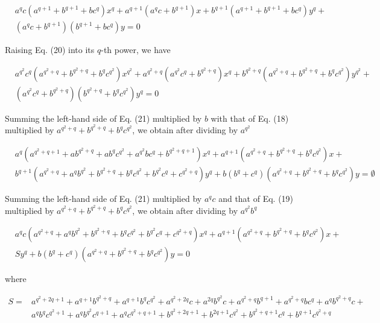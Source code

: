 \documentclass[10pt]{article}
\begin{document}
\begin{align*}
& a^{q} c\left(a^{q+1}+b^{q+1}+b c^{q}\right) x^{q}+a^{q+1}\left(a^{q} c+b^{q+1}\right) x+b^{q+1}\left(a^{q+1}+b^{q+1}+b c^{q}\right) y^{q}+ \\
& \left(a^{q} c+b^{q+1}\right)\left(b^{q+1}+b c^{q}\right) y=0 \tag{20}
\end{align*}


Raising Eq. (20) into its $q$-th power, we have


\begin{align*}
& a^{q^{2}} c^{q}\left(a^{q^{2}+q}+b^{q^{2}+q}+b^{q} c^{q^{2}}\right) x^{q^{2}}+a^{q^{2}+q}\left(a^{q^{2}} c^{q}+b^{q^{2}+q}\right) x^{q}+b^{q^{2}+q}\left(a^{q^{2}+q}+b^{q^{2}+q}+b^{q} c^{q^{2}}\right) y^{q^{2}}+ \\
& \left(a^{q^{2}} c^{q}+b^{q^{2}+q}\right)\left(b^{q^{2}+q}+b^{q} c^{q^{2}}\right) y^{q}=0 \tag{21}
\end{align*}


Summing the left-hand side of Eq. (21) multiplied by $b$ with that of Eq. (18) multiplied by $a^{q^{2}+q}+b^{q^{2}+q}+ b^{q} c^{q^{2}}$, we obtain after dividing by $a^{q^{2}}$


\begin{align*}
& a^{q}\left(a^{q^{2}+q+1}+a b^{q^{2}+q}+a b^{q} c^{q^{2}}+a^{q^{2}} b c^{q}+b^{q^{2}+q+1}\right) x^{q}+a^{q+1}\left(a^{q^{2}+q}+b^{q^{2}+q}+b^{q} c^{q^{2}}\right) x+ \\
& b^{q+1}\left(a^{q^{2}+q}+a^{q} b^{q^{2}}+b^{q^{2}+q}+b^{q} c^{q^{2}}+b^{q^{2}} c^{q}+c^{q^{2}+q}\right) y^{q}+b\left(b^{q}+c^{q}\right)\left(a^{q^{2}+q}+b^{q^{2}+q}+b^{q} c^{q^{2}}\right) y=\emptyset \tag{Q22}
\end{align*}


Summing the left-hand side of Eq. (21) multiplied by $a^{q} c$ and that of Eq. (19) multiplied by $a^{q^{2}+q}+b^{q^{2}+q}+ b^{q} c^{q^{2}}$, we obtain after dividing by $a^{q^{2}} b^{q}$


\begin{align*}
& a^{q} c\left(a^{q^{2}+q}+a^{q} b^{q^{2}}+b^{q^{2}+q}+b^{q} c^{q^{2}}+b^{q^{2}} c^{q}+c^{q^{2}+q}\right) x^{q}+a^{q+1}\left(a^{q^{2}+q}+b^{q^{2}+q}+b^{q} c^{q^{2}}\right) x+ \\
& S y^{q}+b\left(b^{q}+c^{q}\right)\left(a^{q^{2}+q}+b^{q^{2}+q}+b^{q} c^{q^{2}}\right) y=0 \tag{23}
\end{align*}


where

$$
\begin{aligned}
S= & a^{q^{2}+2 q+1}+a^{q+1} b^{q^{2}+q}+a^{q+1} b^{q} c^{q^{2}}+a^{q^{2}+2 q} c+a^{2 q} b^{q^{2}} c+a^{q^{2}+q} b^{q+1}+a^{q^{2}+q} b c^{q}+a^{q} b^{q^{2}+q} c+ \\
& a^{q} b^{q} c^{q^{2}+1}+a^{q} b^{q^{2}} c^{q+1}+a^{q} c^{q^{2}+q+1}+b^{q^{2}+2 q+1}+b^{2 q+1} c^{q^{2}}+b^{q^{2}+q+1} c^{q}+b^{q+1} c^{q^{2}+q}
\end{aligned}
$$
\end{document}
